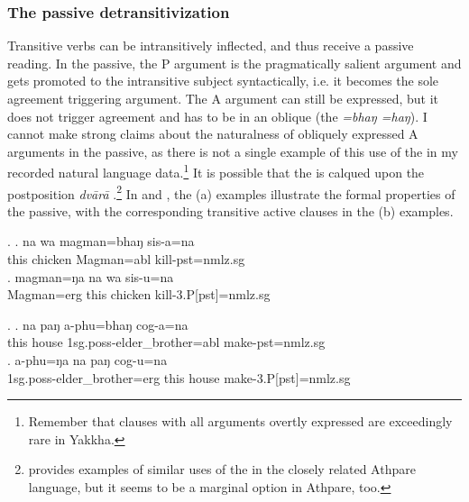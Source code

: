 
\subsubsection{The passive detransitivization}\label{detr-pass}

Transitive verbs can be intransitively inflected, and thus receive a passive reading. In the passive, the P argument is the pragmatically salient argument and gets promoted to the intransitive subject syntactically, i.e. it becomes the sole agreement triggering argument. The  A argument can still be expressed, but it does not trigger agreement and has to be in an oblique  (the  \emph{=bhaŋ \ti =haŋ}). I cannot make strong claims about the naturalness of obliquely expressed A arguments in the passive, as there is not a single example of this use of the  in my recorded natural language data.\footnote{Remember that clauses with all arguments overtly expressed are exceedingly rare in Yakkha.}  It is possible that the  is calqued upon the  postposition \emph{dvārā} .\footnote{\citet[123]{Ebert1997A-grammar} provides examples of similar uses of the  in the closely related Athpare language, but it seems to be a marginal option in Athpare, too.}  In  \Next and \NNext, the (a) examples illustrate the formal properties of the passive, with the corresponding transitive active clauses in the (b) examples.

\ex. \ag. na wa magman=bhaŋ sis-a=na\\
			this chicken  Magman{\sc =abl} kill{\sc [3sg]-pst=nmlz.sg}\\
	\bg. magman=ŋa na wa sis-u=na  \\
		Magman{\sc =erg}	this chicken  kill{\sc -3.P[pst]=nmlz.sg}\\
		
	\ex. \ag.  na paŋ a-phu=bhaŋ cog-a=na \\
	this house  {\sc 1sg.poss-}elder\_brother{\sc =abl} make{\sc [3sg]-pst=nmlz.sg}\\
	\bg. a-phu=ŋa na paŋ cog-u=na \\
	 {\sc 1sg.poss-}elder\_brother{\sc =erg} this house make{\sc -3.P[pst]=nmlz.sg}\\


